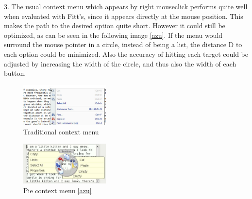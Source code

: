 \documentclass[a4paper,twoside,10pt]{article}
\begin{document}
	3. The usual context menu which appears by right mouseclick performs quite well when evaluated with Fitt's, since it appears directly at the mouse position. This makes the path to the desired option quite short. However it could still be optimized, as can be seen in the following image \ref{azu}. If the menu would surround the mouse pointer in a circle, instead of being a list, the distance D to each option could be minimized. Also the accuracy of hitting each target could be adjusted by increasing the width of the circle, and thus also the width of each button.

\begin{figure}[h]
		\includegraphics[width=0.40\textwidth]{context_menu.pdf}
	\caption{Traditional context menu}
	\label{fig:context_menu}
\end{figure}

\begin{figure}[h]
	\includegraphics[width=0.40\textwidth]{pie_textbox.pdf}
	\caption{Pie context menu \ref{azu}}
	\label{fig:pie_textbox}
\end{figure}
\end{document}
